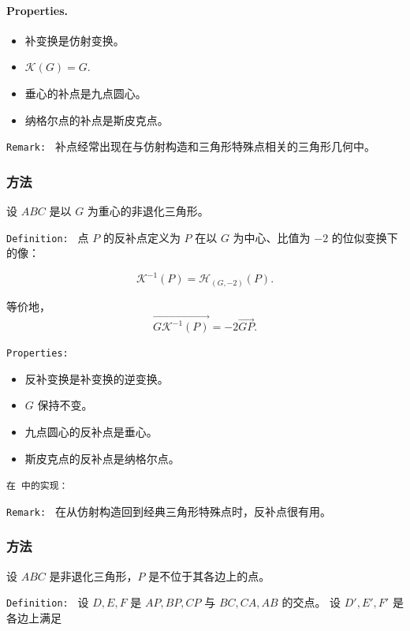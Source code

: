\paragraph{Properties.}
\begin{itemize}
\item 补变换是仿射变换。
\item $\mathcal{K}(G)=G$.
\item 垂心的补点是九点圆心。
\item 纳格尔点的补点是斯皮克点。
\end{itemize}


\texttt{Remark: }
补点经常出现在与仿射构造和三角形特殊点相关的三角形几何中。

\subsubsection{方法 }
\label{ssub:anticomplement}

设 $ABC$ 是以 $G$ 为重心的非退化三角形。

\texttt{Definition: }
点 $P$ 的反补点定义为 $P$ 在以 $G$ 为中心、比值为 $-2$ 的位似变换下的像：

\[
\mathcal{K}^{-1}(P)=\mathcal{H}_{(G,-2)}(P).
\]

等价地，
\[
\overrightarrow{G\mathcal{K}^{-1}(P)}=-2\overrightarrow{GP}.
\]

\texttt{Properties: }
\begin{itemize}
\item 反补变换是补变换的逆变换。
\item $G$ 保持不变。
\item 九点圆心的反补点是垂心。
\item 斯皮克点的反补点是纳格尔点。
\end{itemize}

\texttt{在  中的实现：}


\texttt{Remark: }
在从仿射构造回到经典三角形特殊点时，反补点很有用。


\subsubsection{方法 }
\label{ssub:isotomic}


设 $ABC$ 是非退化三角形，$P$ 是不位于其各边上的点。

\texttt{Definition: }
设 $D,E,F$ 是 $AP,BP,CP$ 与 $BC,CA,AB$ 的交点。
设 $D',E',F'$ 是各边上满足

